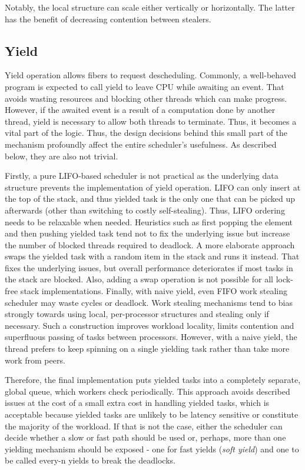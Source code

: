 \documentclass[12pt,a4paper,twoside]{report}
\begin{document}
Notably, the local structure can scale either vertically or horizontally. The latter has the benefit of decreasing contention between stealers.  

\subsection{Yield}
\label{section:yield}

Yield operation allows fibers to request descheduling. Commonly, a well-behaved program is expected to call yield to leave CPU while awaiting an event. That avoids wasting resources and blocking other threads which can make progress. However, if the awaited event is a result of a computation done by another thread, yield is necessary to allow both threads to terminate. Thus, it becomes a vital part of the logic. Thus, the design decisions behind this small part of the mechanism profoundly affect the entire scheduler's usefulness. As described below, they are also not trivial.

Firstly, a pure LIFO-based scheduler is not practical as the underlying data structure prevents the implementation of yield operation. LIFO can only insert at the top of the stack, and thus yielded task is the only one that can be picked up afterwards (other than switching to costly self-stealing). Thus, LIFO ordering needs to be relaxable when needed. Heuristics such as first popping the element and then pushing yielded task tend not to fix the underlying issue but increase the number of blocked threads required to deadlock. A more elaborate approach swaps the yielded task with a random item in the stack and runs it instead. That fixes the underlying issues, but overall performance deteriorates if most tasks in the stack are blocked. Also, adding a swap operation is not possible for all lock-free stack implementations. Finally, with naive yield, even FIFO work stealing scheduler may waste cycles or deadlock. Work stealing mechanisms tend to bias strongly towards using local, per-processor structures and stealing only if necessary. Such a construction improves workload locality, limits contention and superfluous passing of tasks between processors. However, with a naive yield, the thread prefers to keep spinning on a single yielding task rather than take more work from peers.

Therefore, the final implementation puts yielded tasks into a completely separate, global queue, which workers check periodically. This approach avoids described issues at the cost of a small extra cost in handling yielded tasks, which is acceptable because yielded tasks are unlikely to be latency sensitive or constitute the majority of the workload. If that is not the case, either the scheduler can decide whether a slow or fast path should be used or, perhaps, more than one yielding mechanism should be exposed - one for fast yields (\textit{soft yield}) and one to be called every-n yields to break the deadlocks. 
\end{document}
